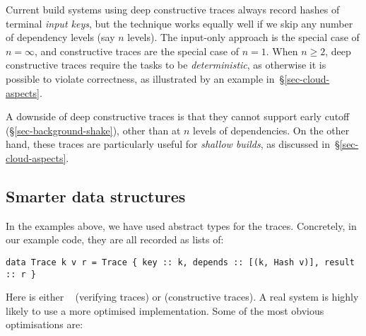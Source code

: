 Current build systems using deep constructive traces always record hashes of
terminal \emph{input keys}, but the technique works equally well if we skip any
number of dependency levels (say $n$ levels). The input-only approach is the
special case of $n = \infty$, and constructive traces are the special case of
$n = 1$. When $n \ge 2$, deep constructive traces require the tasks to be
\emph{deterministic}, as otherwise it is possible to violate correctness, as
illustrated by an example in~\S\ref{sec-cloud-aspects}.


A downside of deep constructive traces is that they cannot support early cutoff
(\S\ref{sec-background-shake}), other than at $n$ levels of dependencies. On the
other hand, these traces are particularly useful for \emph{shallow builds}, as
discussed in~\S\ref{sec-cloud-aspects}.

\subsection{Smarter \hs{[Trace]} data structures}\label{sec-smart-traces}

In the examples above, we have used abstract types for the traces. Concretely, in our example code, they are all recorded as lists of:

\begin{verbatim}
data Trace k v r = Trace { key :: k, depends :: [(k, Hash v)], result :: r }
\end{verbatim}

Here  is either ~ (verifying traces) or
 (constructive traces). A real system is highly likely to use a more
optimised implementation. Some of the most obvious optimisations are:

